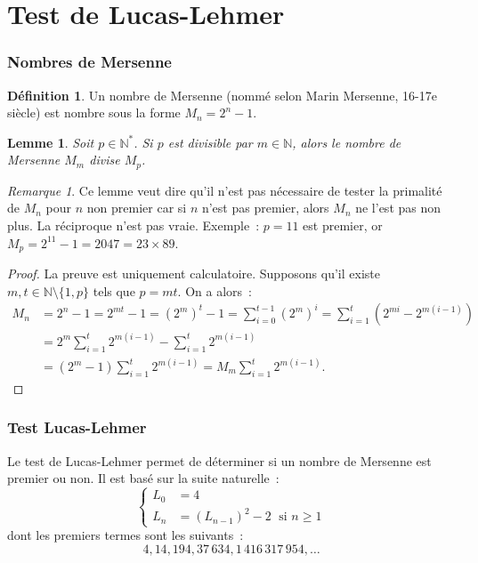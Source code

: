 \documentclass[10pt, mathserif]{beamer}
\newcommand{\N}{\mathbb N}
\newtheorem{lem}[thm]{Lemme}
\theoremstyle{definition}
\newtheorem{déf}[thm]{Définition}
\theoremstyle{remark}
\newtheorem*{rmq}{Remarque}
\begin{document}
\section{Test de Lucas-Lehmer}
	\begin{frame}
		\frametitle{Nombres de Mersenne}
		\begin{déf}
			Un nombre de Mersenne (nommé selon Marin Mersenne, 16-17e siècle) est nombre sous la forme $M_n = 2^n-1$.
		\end{déf}

		\begin{lem}
			Soit $p \in \N^*$. Si $p$ est divisible par $m \in \N$, alors le nombre de Mersenne $M_m$ divise $M_p$.
		\end{lem}

		\begin{rmq}
			Ce lemme veut dire qu'il n'est pas nécessaire de tester la primalité de $M_n$ pour $n$ non premier car si $n$ n'est pas premier, alors $M_n$ ne
			l'est pas non plus. La réciproque n'est pas vraie. Exemple~: $p = 11$ est premier, or $M_p = 2^{11}-1 = 2047 = 23 \times 89$.
		\end{rmq}
	\end{frame}

	\begin{frame}
		\begin{proof}
			La preuve est uniquement calculatoire. Supposons qu'il existe $m, t \in \N \setminus \{1, p\}$ tels que $p = mt$. On a alors~:
			\[\begin{aligned}
				M_n &= 2^n-1 = 2^{mt}-1 = \left(2^m\right)^t - 1 = \sum_{i=0}^{t-1}\left(2^m\right)^i = \sum_{i=1}^t\left(2^{mi} - 2^{m(i-1)}\right) \\
				    &= 2^m\sum_{i=1}^t2^{m(i-1)}-\sum_{i=1}^t2^{m(i-1)} \\
				    &= (2^m-1)\sum_{i=1}^t2^{m(i-1)} = M_m\sum_{i=1}^t2^{m(i-1)}.
			\end{aligned}\]
		\end{proof}
	\end{frame}

	\begin{frame}
		\frametitle{Test Lucas-Lehmer}
		Le test de Lucas-Lehmer permet de déterminer si un nombre de Mersenne est premier ou non. Il est basé sur la suite naturelle~:
		\[\begin{cases}
			L_0 &= 4 \\
			L_n &= (L_{n-1})^2 - 2 \;\text{ si } n \geq 1
		\end{cases}\]
		dont les premiers termes sont les suivants~:
		\[4, 14, 194, 37\,634, 1\,416\,317\,954, \ldots\]
	\end{frame}
\end{document}

